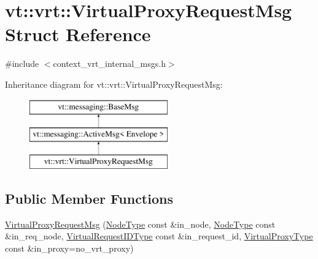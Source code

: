 \hypertarget{structvt_1_1vrt_1_1_virtual_proxy_request_msg}{}\section{vt\+:\+:vrt\+:\+:Virtual\+Proxy\+Request\+Msg Struct Reference}
\label{structvt_1_1vrt_1_1_virtual_proxy_request_msg}


{\ttfamily \#include $<$context\+\_\+vrt\+\_\+internal\+\_\+msgs.\+h$>$}

Inheritance diagram for vt\+:\+:vrt\+:\+:Virtual\+Proxy\+Request\+Msg\+:\begin{figure}[H]
\begin{center}
\leavevmode
\includegraphics[height=3.000000cm]{structvt_1_1vrt_1_1_virtual_proxy_request_msg}
\end{center}
\end{figure}
\subsection*{Public Member Functions}
\begin{DoxyCompactItemize}
\item 
\hyperlink{structvt_1_1vrt_1_1_virtual_proxy_request_msg_a6110022c17055897cf543078d076fe95}{Virtual\+Proxy\+Request\+Msg} (\hyperlink{namespacevt_a866da9d0efc19c0a1ce79e9e492f47e2}{Node\+Type} const \&in\+\_\+node, \hyperlink{namespacevt_a866da9d0efc19c0a1ce79e9e492f47e2}{Node\+Type} const \&in\+\_\+req\+\_\+node, \hyperlink{namespacevt_1_1vrt_ac7ef8820ebfc383fa16f09bf46eaa2b8}{Virtual\+Request\+I\+D\+Type} const \&in\+\_\+request\+\_\+id, \hyperlink{namespacevt_a1b417dd5d684f045bb58a0ede70045ac}{Virtual\+Proxy\+Type} const \&in\+\_\+proxy=no\+\_\+vrt\+\_\+proxy)
\end{DoxyCompactItemize}

